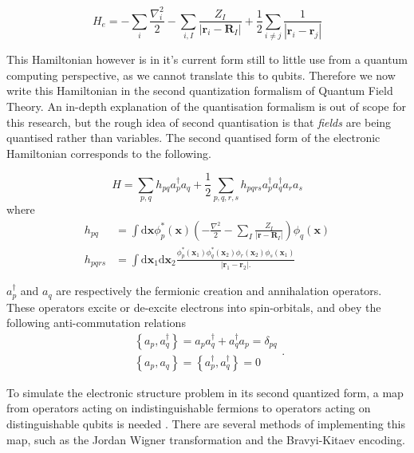 $$
H_{e}=-\sum_{i} \frac{\nabla_{i}^{2}}{2}-\sum_{i, I} \frac{Z_{I}}{\left|\mathbf{r}_{i}-\mathbf{R}_{I}\right|}+\frac{1}{2} \sum_{i \neq j} \frac{1}{\left|\mathbf{r}_{i}-\mathbf{r}_{j}\right|}
$$

This Hamiltonian however is in it's current form still to little use from a quantum computing perspective, as we cannot translate this to qubits. Therefore we now write this Hamiltonian in the second quantization formalism of Quantum Field Theory. An in-depth explanation of the quantisation formalism is out of scope for this research, but the rough idea of second quantisation is that \textit{fields} are being quantised rather than variables. The second quantised form of the electronic Hamiltonian corresponds to the following.

\[
H=\sum_{p, q} h_{p q} a_{p}^{\dagger} a_{q}+\frac{1}{2} \sum_{p, q, r, s} h_{p q r s} a_{p}^{\dagger} a_{q}^{\dagger} a_{r} a_{s}
\]
where
\[
\begin{aligned}
h_{p q} &=\int \mathrm{d} \mathbf{x} \phi_{p}^{*}(\mathbf{x})\left(-\frac{\nabla^{2}}{2}-\sum_{I} \frac{Z_{I}}{\left|\mathbf{r}-\mathbf{R}_{I}\right|}\right) \phi_{q}(\mathbf{x}) \\
h_{p q r s} &=\int \mathrm{d} \mathbf{x}_{1} \mathrm{d} \mathbf{x}_{2} \frac{\phi_{p}^{*}\left(\mathbf{x}_{1}\right) \phi_{q}^{*}\left(\mathbf{x}_{2}\right) \phi_{r}\left(\mathbf{x}_{2}\right) \phi_{s}\left(\mathbf{x}_{1}\right)}{\left|\mathbf{r}_{1}-\mathbf{r}_{2}\right|.}
\end{aligned}
\]

$a_{p}^{\dagger}$ and $ a_{q}$ are respectively the fermionic creation and annihalation operators. These operators excite or de-excite electrons into spin-orbitals, and obey the following anti-commutation relations
$$
\begin{array}{l}
\left\{a_{p}, a_{q}^{\dagger}\right\}=a_{p} a_{q}^{\dagger}+a_{q}^{\dagger} a_{p}=\delta_{p q} \\
\left\{a_{p}, a_{q}\right\}=\left\{a_{p}^{\dagger}, a_{q}^{\dagger}\right\}=0
\end{array}.
$$

To simulate the electronic structure problem in its second quantized form, a map from operators acting on indistinguishable fermions to operators acting on distinguishable qubits is needed \cite{McArdle}. There are several methods of implementing this map, such as the Jordan Wigner transformation and the Bravyi-Kitaev encoding.
\\

